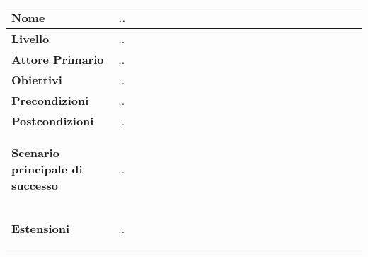 \begin{center}
    \begin{tabular}{p{0.3\linewidth}|p{0.7\linewidth}}
    \hline
    \rowcolor{Blue}
    \textbf{Nome} & .. \\
    \hline
    \rowcolor{DarkBlue}
    \textbf{Livello} & .. \\
    \hline
    \rowcolor{LightBlue}
    \textbf{Attore Primario} & .. \\
    \hline
    \rowcolor{LightBlue}
    \textbf{Obiettivi} & .. \\
    \hline
    \rowcolor{Blue}
    \textbf{Precondizioni} & .. \\
    \hline
    \rowcolor{LightBlue}
    \textbf{Postcondizioni} & .. \\
    \hline
    \rowcolor{LighterBlue}
        \begin{center}
        \textbf{Scenario principale di successo}
    \end{center} 
    & .. \\
    \hline
    \rowcolor{LighterBlue}
    \begin{center}
        \textbf{Estensioni}
    \end{center} 
    & .. \\
    \hline
    \end{tabular}
\end{center}